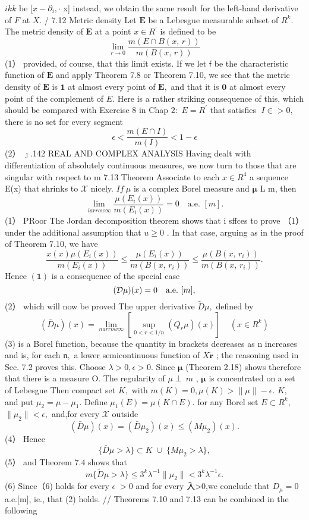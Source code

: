 $\scriptstyle{i k k}$ be $[x-\partial_{i},\cdot$ x] instead, we obtain the same result for the left-hand derivative of ${\mathbf{}}F$ at $\scriptstyle{X.}$ / 7.12 Metric density Let $\boldsymbol{E}$ be a Lebesgue measurable subset of $R^{k}.$ The metric density of $\boldsymbol{E}$ at a point $x\in R^{\prime}$ is defined to be $$ \operatorname*{lim}_{r\to0}{\frac{m(E\cap B(x,\,r))}{m(B(x,\,r))}} $$ (1） provided, of course, that this limit exists. If we let $\boldsymbol{\mathsf{f}}$ be the characteristic function of $\boldsymbol{E}$ and apply Theorem 7.8 or Theorem 7.10, we see that the metric density of $\boldsymbol{E}$ is $\mathbf{1}$ at almost every point of ${\boldsymbol{E}},$ and that it is $\mathbf{0}$ at almost every point of the complement of $\textstyle E.$ Here is a rather striking consequence of this, which should be compared with Exercise 8 in Chap $2\colon$ $E=R^{\prime}$ that satisfies $\;I\in>0,$ there is no set for every segment $$ \epsilon<\frac{m(E\cap I)}{m(I)}<1-\epsilon $$ (2） ${\boldsymbol{\jmath}}.$142 REAL AND COMPLEX ANALYSIS Having dealt with differentiation of absolutely continuous measures, we now turn to those that are singular with respect to m 7.13 Theorem Associate to each $x\in R^{4}$ a sequence {E(x)} that shrinks to $\scriptstyle{\mathcal{X}}$ nicely. $I f~\mu$ is a complex Borel measure and ${\boldsymbol{\mu}}$ L m, then $$ \operatorname*{lim}_{i arrow\infty}\frac{\mu(E_{i}(x))}{m(E_{i}(x))}=0\quad\mathrm{a.e.}\,\,[m]. $$ (1） PRoor The Jordan decomposition theorem shows that i sffces to prove （1） under the additional assumption that $\scriptstyle u\geq0$ . In that case, arguing as in the proof of Theorem 7.10, we have $$ {\frac{x(x)\mu(E_{i}(x))}{m(E_{i}(x))}}\leq{\frac{\mu(E_{i}(x))}{m(B(x,\,r_{i}))}}\leq{\frac{\mu(B(x,\,r_{i}))}{m(B(x,\,r_{i}))}}. $$ Hence $\mathbf{(1)}$ is a consequence of the special case $$ ({\cal D}\mu)(x)=0\quad\mathrm{a.e.~}[m], $$ (2） which will now be proved The upper derivative ${\tilde{D}}\mu,$ defined by $$ (\bar{D}\mu)(x)=\operatorname*{lim}_{n arrow\infty}\left[\operatorname*{sup}_{0<r<1/n}(Q_{r}\mu)(x)\right]~~~~~(x\in R^{k}) $$ (3) is a Borel function, because the quantity in brackets decreases as n increases and is, for each ${\mathfrak{n}},$ a lower semicontinuous function of $X{\dot{\boldsymbol{r}}}$ ; the reasoning used in Sec. 7.2 proves this. Choose $\lambda>0,\epsilon>0.$ Since ${\boldsymbol{\mu}}$ (Theorem 2.18) shows therefore that there is a measure O. The regularity of $\mu\perp\ m$ , $\boldsymbol{\mu}$ is concentrated on a set of Lebesgue Then compact set $K,$ with $m(K)=0,\mu(K)>\|\mu\|-\epsilon.$ $K,$ and put $\mu_{2}=\mu-\mu_{1}.$ Define $\mu_{1}(E)=\mu(K\cap E).$ for any Borel set $E\subset R^{k},$ $\|\mu_{2}\|<\epsilon,$ and,for every $\scriptstyle{\mathcal{X}}$ outside $$ (\bar{D}\mu)(x)=(\bar{D}\mu_{2})(x)\leq(M\mu_{2})(x). $$ (4） Hence $$ \{\bar{D}\mu>\lambda\}\subset K\;\cup\;\{M\mu_{2}>\lambda\}, $$ (5） and Theorem $7.4$ shows that $$ m\{\tilde{D}\mu>\lambda\}\leq3^{k}\lambda^{-1}\|\mu_{2}\|<3^{k}\lambda^{-1}\epsilon. $$ (6) Since（6) holds for every $\scriptstyle\epsilon\;>0$ and for every 入>0,we conclude that $\scriptstyle D_{\mu}=0$ a.e.[m], ie., that (2) holds. // Theorems 7.10 and 7.13 can be combined in the following 